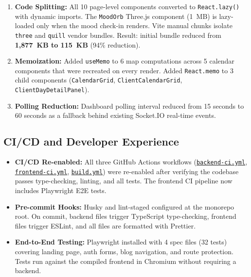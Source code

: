 \documentclass[12pt,letterpaper]{article}
\newcommand{\ghrepo}{https://github.com/omniV1/lunaraCare}
\begin{document}
\begin{enumerate}[nosep]
  \item \textbf{Code Splitting:} All 10 page-level components converted to \texttt{React.lazy()} with dynamic imports. The \texttt{MoodOrb} Three.js component (1~MB) is lazy-loaded only when the mood check-in renders. Vite manual chunks isolate \texttt{three} and \texttt{quill} vendor bundles. Result: initial bundle reduced from \textbf{1,877~KB to 115~KB} (94\% reduction).
  \item \textbf{Memoization:} Added \texttt{useMemo} to 6 map computations across 5 calendar components that were recreated on every render. Added \texttt{React.memo} to 3 child components (\texttt{CalendarGrid}, \texttt{ClientCalendarGrid}, \texttt{ClientDayDetailPanel}).
  \item \textbf{Polling Reduction:} Dashboard polling interval reduced from 15 seconds to 60 seconds as a fallback behind existing Socket.IO real-time events.
\end{enumerate}

\subsection{CI/CD and Developer Experience}

\begin{itemize}[nosep]
  \item \textbf{CI/CD Re-enabled:} All three GitHub Actions workflows (\href{\ghrepo/blob/main/.github/workflows/backend-ci.yml}{\texttt{backend-ci.yml}}, \href{\ghrepo/blob/main/.github/workflows/frontend-ci.yml}{\texttt{frontend-ci.yml}}, \href{\ghrepo/blob/main/.github/workflows/build.yml}{\texttt{build.yml}}) were re-enabled after verifying the codebase passes type-checking, linting, and all tests. The frontend CI pipeline now includes Playwright E2E tests.
  \item \textbf{Pre-commit Hooks:} Husky and lint-staged configured at the monorepo root. On commit, backend files trigger TypeScript type-checking, frontend files trigger ESLint, and all files are formatted with Prettier.
  \item \textbf{End-to-End Testing:} Playwright installed with 4 spec files (32 tests) covering landing page, auth forms, blog navigation, and route protection. Tests run against the compiled frontend in Chromium without requiring a backend.
\end{itemize}

\end{document}
